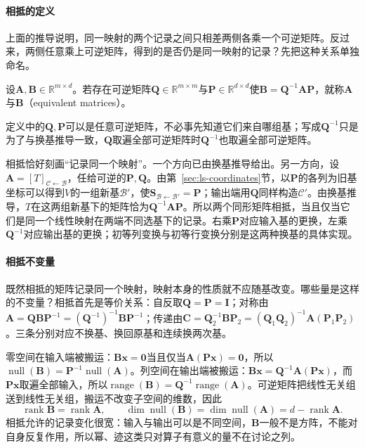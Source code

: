 \paragraph{相抵的定义}
\label{sec:ls-equivalence-meaning}
上面的推导说明，同一映射的两个记录之间只相差两侧各乘一个可逆矩阵。反过来，两侧任意乘上可逆矩阵，得到的是否仍是同一映射的记录？先把这种关系单独命名。
\begin{definition}[矩阵相抵]
\label{def:ls-matrix-equivalence}
设$\bm A,\bm B\in\mathbb R^{m\times d}$。若存在可逆矩阵$\bm Q\in\mathbb R^{m\times m}$与$\bm P\in\mathbb R^{d\times d}$使$\bm B=\bm Q^{-1}\bm A\bm P$，就称$\bm A$与$\bm B$（equivalent matrices）。
\end{definition}
定义中的$\bm Q,\bm P$可以是任意可逆矩阵，不必事先知道它们来自哪组基；写成$\bm Q^{-1}$只是为了与换基推导一致，$\bm Q$取遍全部可逆矩阵时$\bm Q^{-1}$也取遍全部可逆矩阵。

相抵恰好刻画“记录同一个映射”。一个方向已由换基推导给出。另一方向，设$\bm A=[T]_{\mathcal C\leftarrow\mathcal B}$，任给可逆的$\bm P,\bm Q$。由第~\ref{sec:ls-coordinates}节，以$\bm P$的各列为旧基坐标可以得到$V$的一组新基$\mathcal B'$，使$\bm S_{\mathcal B\leftarrow\mathcal B'}=\bm P$；输出端用$\bm Q$同样构造$\mathcal C'$。由换基推导，$T$在这两组新基下的矩阵恰为$\bm Q^{-1}\bm A\bm P$。所以两个同形矩阵相抵，当且仅当它们是同一个线性映射在两端不同选基下的记录。右乘$\bm P$对应输入基的更换，左乘$\bm Q^{-1}$对应输出基的更换；初等列变换与初等行变换分别是这两种换基的具体实现。

\paragraph{相抵不变量}
\label{sec:ls-equivalence-properties}
既然相抵的矩阵记录同一个映射，映射本身的性质就不应随基改变。哪些量是这样的不变量？相抵首先是等价关系：自反取$\bm Q=\bm P=\bm I$；对称由$\bm A=\bm Q\bm B\bm P^{-1}=(\bm Q^{-1})^{-1}\bm B\bm P^{-1}$；传递由$\bm C=\bm Q_2^{-1}\bm B\bm P_2=(\bm Q_1\bm Q_2)^{-1}\bm A(\bm P_1\bm P_2)$。三条分别对应不换基、换回原基和连续换两次基。

零空间在输入端被搬运：$\bm B\bm x=\bm0$当且仅当$\bm A(\bm P\bm x)=\bm0$，所以$\operatorname{null}(\bm B)=\bm P^{-1}\operatorname{null}(\bm A)$。列空间在输出端被搬运：$\bm B\bm x=\bm Q^{-1}\bm A(\bm P\bm x)$，而$\bm P\bm x$取遍全部输入，所以$\operatorname{range}(\bm B)=\bm Q^{-1}\operatorname{range}(\bm A)$。可逆矩阵把线性无关组送到线性无关组，搬运不改变子空间的维数，因此
\begin{equation}
 \operatorname{rank}\bm B=\operatorname{rank}\bm A,
 \qquad
 \dim\operatorname{null}(\bm B)=\dim\operatorname{null}(\bm A)=d-\operatorname{rank}\bm A.
 \label{eq:ls-equivalence-invariants}
\end{equation}
相抵允许的记录变化很宽：输入与输出可以是不同空间，$\bm B$一般不是方阵，不能对自身反复作用，所以幂、迹这类只对算子有意义的量不在讨论之列。

